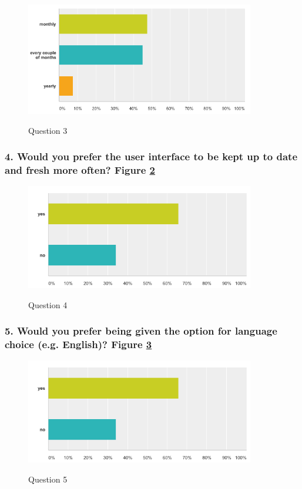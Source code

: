 \begin{figure}[!h]
    \caption{Question 3}
    \centering
    \includegraphics[width=100mm]{images/survey/time}
    \label{fig:label3}
\end{figure}


\subsubsection{4. Would you prefer the user interface to be kept up to date and fresh more often? Figure \ref{fig:label4} }

\begin{figure}[!h]
    \caption{Question 4}
    \centering
    \includegraphics[width=100mm]{images/survey/updates}
    \label{fig:label4}
\end{figure}

\subsubsection{5. Would you prefer being given the option for language choice (e.g. English)? Figure \ref{fig:label5}}

\begin{figure}[!h]
    \caption{Question 5}
    \centering
    \includegraphics[width=100mm]{images/survey/language}
    \label{fig:label5}
\end{figure}


